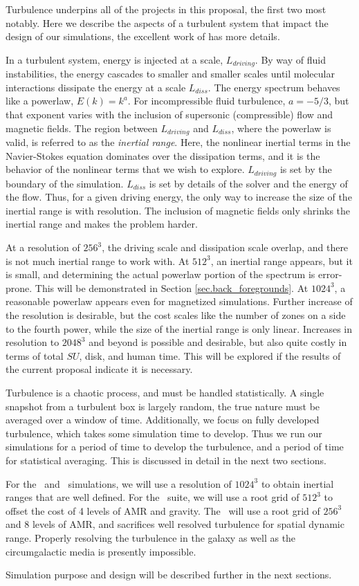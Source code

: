 Turbulence underpins all of the projects in this proposal, the first two most
notably.  Here we describe the aspects of a turbulent system that impact the
design of our simulations, the excellent work of \citet{Frisch95} has more
details.

In a turbulent system, energy is injected at a scale, $L_{driving}$.  By way of
fluid instabilities, the energy cascades to smaller and smaller scales until
molecular interactions dissipate the energy at a scale $L_{diss}$.  The energy
spectrum 
behaves like a powerlaw, $E(k)=k^{a}$.  For incompressible fluid turbulence,
$a=-5/3$, but that exponent varies with the inclusion of supersonic
(compressible) flow and magnetic fields.  The region between
$L_{driving}$ and $L_{diss}$, where the powerlaw is valid, is referred to as
the \emph{inertial range}.  Here, the nonlinear inertial terms in the
Navier-Stokes equation dominates over the dissipation terms, and it is the
behavior of the nonlinear terms that we wish to explore.  $L_{driving}$ is set
by the boundary of the simulation. $L_{diss}$ is set by details of the
solver and the energy of the flow.  Thus, for a given driving energy, the only
way to increase the size of the inertial range is with resolution.  The
inclusion of magnetic fields only shrinks the inertial range and makes the
problem harder.

At a resolution of $256^3$, the driving scale and dissipation scale overlap, and
there is not much inertial range to work with.  At $512^3$, an inertial range
appears, but it is small, and determining the actual powerlaw portion of the
spectrum is error-prone.  This will be demonstrated in Section
\ref{sec.back_foregrounds}.  At $1024^3$, a reasonable powerlaw appears even for
magnetized simulations.  Further increase of the resolution is desirable, but
the cost scales like the number of zones on a side to the fourth power, while
the size of the inertial range is only linear.  Increases in resolution to
$2048^3$ and beyond is possible and desirable, but also quite costly in terms of
total $SU$, disk, and human time.  This will be explored if the results of the
current proposal indicate it is necessary.  

Turbulence is a chaotic process, and must be handled statistically.  A single
snapshot from a turbulent box is largely random, the true nature must be
averaged over a window of time.  Additionally, we focus on fully developed
turbulence, which takes some simulation time to develop. Thus we run our
simulations for a period of time to develop the turbulence, and a period of time
for statistical averaging.  This is discussed in detail in the next two
sections.

For the \nameCMB\ and \nameTurbulence\ simulations, we will use a resolution of $1024^3$ to
obtain inertial ranges that are well defined.  For the \nameCores\ suite, we
will use a root grid of $512^3$ to offset the cost of 4 levels of AMR and
gravity.  The
\nameGalaxies\ will use a root grid of $256^3$ and 8 levels of AMR, and
sacrifices well resolved turbulence for spatial dynamic range.  Properly
resolving the turbulence in the galaxy as well as the circumgalactic media is
presently impossible.  

Simulation purpose and design will be described further in the next
sections.
